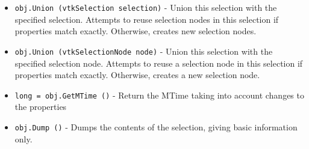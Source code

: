 \begin{itemize}
\item  \verb|obj.Union (vtkSelection selection)| -  Union this selection with the specified selection.
 Attempts to reuse selection nodes in this selection if properties
 match exactly. Otherwise, creates new selection nodes.

\item  \verb|obj.Union (vtkSelectionNode node)| -  Union this selection with the specified selection node.
 Attempts to reuse a selection node in this selection if properties
 match exactly. Otherwise, creates a new selection node.

\item  \verb|long = obj.GetMTime ()| -  Return the MTime taking into account changes to the properties

\item  \verb|obj.Dump ()| -  Dumps the contents of the selection, giving basic information only.

\end{itemize}
